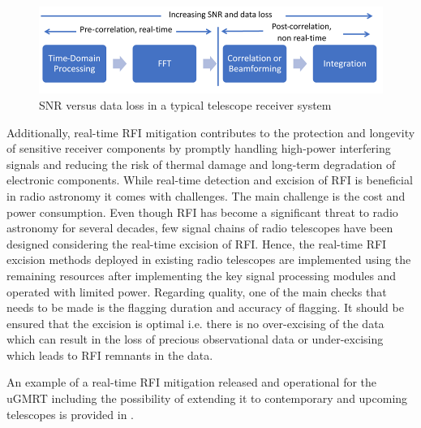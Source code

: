 \begin{figure}
    \centering
    \includegraphics[scale=0.8]{Hardware Excision Techniques/figures/rt.jpg}
    \caption{SNR versus data loss in a typical telescope receiver system}
    \label{fig:real-time-rfi}
\end{figure}


Additionally, real-time RFI mitigation contributes to the protection and longevity of sensitive receiver components by promptly handling high-power interfering signals and reducing the risk of thermal damage and long-term degradation of electronic components.
While real-time detection and excision of RFI is beneficial in radio astronomy it comes with challenges. The main challenge is the cost and power consumption. Even though RFI has become a significant threat to radio astronomy for several decades, few signal chains of radio telescopes have been designed considering the real-time excision of RFI. Hence, the real-time RFI excision methods deployed in existing radio telescopes are implemented using the remaining resources after implementing the key signal processing modules and operated with limited power. Regarding quality, one of the main checks that needs to be made is the flagging duration and accuracy of flagging.  It should be ensured that the excision is optimal i.e. there is no over-excising of the data which can result in the loss of precious observational data or under-excising which leads to RFI remnants in the data.


An example of a real-time RFI mitigation released and operational for the uGMRT including the possibility of extending it to contemporary and upcoming telescopes is provided in \cite{buch2023real}.










